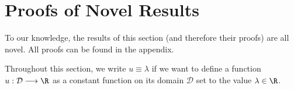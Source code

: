 


\section{Proofs of Novel Results}
\label{sec:main proofs}

To our knowledge, the results of this section (and therefore their proofs) are all novel. All proofs can be found in the appendix.

Throughout this section, we write $u \equiv \lambda$ if we want to define a function $u: \mathcal{D} \longrightarrow \R$ as a constant function on its domain $\mathcal{D}$ set to the value $\lambda \in \R$.

